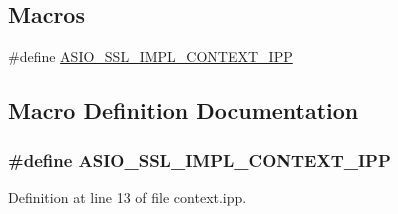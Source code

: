 \subsection*{Macros}
\begin{DoxyCompactItemize}
\item 
\#define \hyperlink{context_8ipp_a315f742441c77852bd5f02899e3d4ddd}{A\+S\+I\+O\+\_\+\+S\+S\+L\+\_\+\+I\+M\+P\+L\+\_\+\+C\+O\+N\+T\+E\+X\+T\+\_\+\+I\+P\+P}
\end{DoxyCompactItemize}


\subsection{Macro Definition Documentation}
\hypertarget{context_8ipp_a315f742441c77852bd5f02899e3d4ddd}{}
\subsubsection[{A\+S\+I\+O\+\_\+\+S\+S\+L\+\_\+\+I\+M\+P\+L\+\_\+\+C\+O\+N\+T\+E\+X\+T\+\_\+\+I\+P\+P}]{\setlength{\rightskip}{0pt plus 5cm}\#define A\+S\+I\+O\+\_\+\+S\+S\+L\+\_\+\+I\+M\+P\+L\+\_\+\+C\+O\+N\+T\+E\+X\+T\+\_\+\+I\+P\+P}\label{context_8ipp_a315f742441c77852bd5f02899e3d4ddd}


Definition at line 13 of file context.\+ipp.

